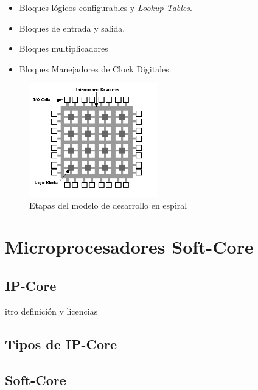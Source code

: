 \begin {itemize}
\item  Bloques lógicos configurables y \textit{Lookup Tables}.
\item  Bloques de entrada y salida.
\item  Bloques multiplicadores
\item  Bloques Manejadores de Clock Digitales.

 \end {itemize}



\begin{figure}[h!]
 \begin{center}
  \includegraphics[width=0.5\textwidth,keepaspectratio=true]{./images/fpga1a}
  \caption{Etapas del modelo de desarrollo en espiral}
  \label{fig:esquema}
 \end{center}
\end{figure}

\section{Microprocesadores Soft-Core}
		\subsection{ IP-Core}
itro definición y licencias
		\subsection{Tipos de IP-Core}
		\subsection{Soft-Core}%


